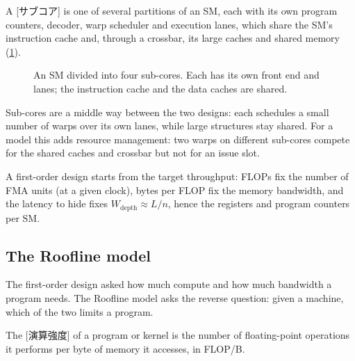 \documentclass[../main.tex]{subfiles}
\begin{document}
\begin{definition}
  \label{def:l08-sub-core}
  A [サブコア] is one of several partitions of an SM,
  each with its own program counters, decoder, warp scheduler and
  execution lanes, which share the SM's instruction cache and, through
  a crossbar, its large caches and shared memory
  (\cref{fig:l08-subcore}).
\end{definition}

\begin{figure}[tb]
  \centering
  
  \caption{An SM divided into four sub-cores.  Each has its own front
    end and lanes; the instruction cache and the data caches are
    shared.}
  \label{fig:l08-subcore}
\end{figure}

Sub-cores are a middle way between the two designs: each schedules a
small number of warps over its own lanes, while large structures stay
shared.  For a model this adds resource management: two warps on
different sub-cores compete for the shared caches and crossbar but not
for an issue slot.

\begin{keypoint}
  A first-order design starts from the target throughput: FLOPs fix the
  number of FMA units (at a given clock), bytes per FLOP fix the
  memory bandwidth, and the latency to hide fixes $W_{\text{depth}}
  \approx L/n$, hence the registers and program counters per SM.
\end{keypoint}

\subsection{The Roofline model}

The first-order design asked how much compute and how much bandwidth a
program needs.  The Roofline model asks the reverse question: given a
machine, which of the two limits a program.

\begin{definition}
  \label{def:l08-arithmetic-intensity}
  The [演算強度] of a program or kernel is
  the number of floating-point operations it performs per byte of
  memory it accesses, in FLOP/B.
\end{definition}
\end{document}
